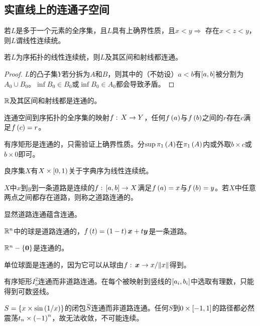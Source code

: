 \documentclass{ctexrep}
\begin{document}
  \subsection{实直线上的连通子空间}
  \begin{definition}
    若$L$是多于一个元素的全序集，且$L$具有上确界性质，且$x<y\Rightarrow$ 存在$x<z<y$，则$L$谓线性连续统。
  \end{definition}
  \begin{theorem}
    若$L$为序拓扑的线性连续统，则$L$及其区间和射线都连通。
  \end{theorem}
  \begin{proof}
    $L$的凸子集$Y$若分拆为$A$和$B$，则其中的（不妨设）$a<b$有$\left[a,b\right]$被分割为$A_0\cup B_0$。$\inf B_0 \in B_0$或$\inf B_0\in A_0$都会导致矛盾。
  \end{proof}
  \begin{corollary}
    $\mathbb{R}$及其区间和射线都是连通的。
  \end{corollary}
  \begin{theorem}[介值定理]
    连通空间到序拓扑的全序集的映射$f:\, X \rightarrow Y$，任何$f\left(a\right)$与$f\left(b\right)$之间的$r$存在$c$满足$f\left(c\right)=r$。
  \end{theorem}
  \begin{ex}
    有序矩形是连通的，只需验证上确界性质。分$\sup \pi_1 \left(A\right)$在$\pi_1 \left(A\right)$内或外取$b\times c$或$b\times 0$即可。
  \end{ex}
  \begin{ex}
    良序集$X$有$X\times\left[0,1\right)$关于字典序为线性连续统。
  \end{ex}
  \begin{definition}
    $X$中$x$到$y$到一条道路是连续的$f:\, \left[a,b\right] \rightarrow X$满足$f\left(a\right)=x$与$f\left(b\right)=y$。若$X$中任意两点之间都存在道路，则称之道路连通的。
  \end{definition}
  显然道路连通蕴含连通。
  \begin{ex}
    $\mathbb{R}^n$中的球是道路连通的，$f\left(t\right)=\left(1-t\right)\boldsymbol{x}+t\boldsymbol{y}$是一条道路。
  \end{ex}
  \begin{ex}
    $\mathbb{R}^n-\left\{\boldsymbol{0}\right\}$是连通的。
  \end{ex}
  \begin{ex}
    单位球面是连通的，因为它可以从球由$f:\, \boldsymbol{x} \rightarrow x/\norm{x}$得到。
  \end{ex}
  \begin{ex}
    有序矩形$I_o^2$连通而非道路连通。在每个被映射到竖线的$\left[a_i,b_i\right]$中选取有理数，只能得到可数竖线。
  \end{ex}
  \begin{ex}
    $S=\left\{x\times \sin\left(1/x\right)\right\}$的闭包$\clo{S}$连通而非道路连通。任何$S$到$0\times\left[-1,1\right]$的路径都必然震荡$t_n \times \left(-1\right)^n$，故无法收敛，不可能连续。
  \end{ex}
\end{document}
